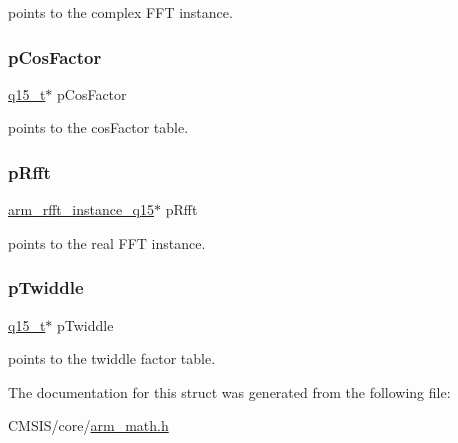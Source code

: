 points to the complex F\+FT instance. \mbox{\label{structarm__dct4__instance__q15_a9d858d313cbba67ceaef9704bc9c43b0}} 
\subsubsection{\texorpdfstring{pCosFactor}{pCosFactor}}
{\footnotesize\ttfamily \mbox{\hyperlink{arm__math_8h_ab5a8fb21a5b3b983d5f54f31614052ea}{q15\+\_\+t}}$\ast$ p\+Cos\+Factor}

points to the cos\+Factor table. \mbox{\label{structarm__dct4__instance__q15_aea6aa42c838f2b22c8c31e9e259b8d75}} 
\subsubsection{\texorpdfstring{pRfft}{pRfft}}
{\footnotesize\ttfamily \mbox{\hyperlink{structarm__rfft__instance__q15}{arm\+\_\+rfft\+\_\+instance\+\_\+q15}}$\ast$ p\+Rfft}

points to the real F\+FT instance. \mbox{\label{structarm__dct4__instance__q15_aa8c837c05b2c910342ab8f171d30dc02}} 
\subsubsection{\texorpdfstring{pTwiddle}{pTwiddle}}
{\footnotesize\ttfamily \mbox{\hyperlink{arm__math_8h_ab5a8fb21a5b3b983d5f54f31614052ea}{q15\+\_\+t}}$\ast$ p\+Twiddle}

points to the twiddle factor table. 

The documentation for this struct was generated from the following file\+:\begin{DoxyCompactItemize}
\item 
C\+M\+S\+I\+S/core/\mbox{\hyperlink{arm__math_8h}{arm\+\_\+math.\+h}}\end{DoxyCompactItemize}
